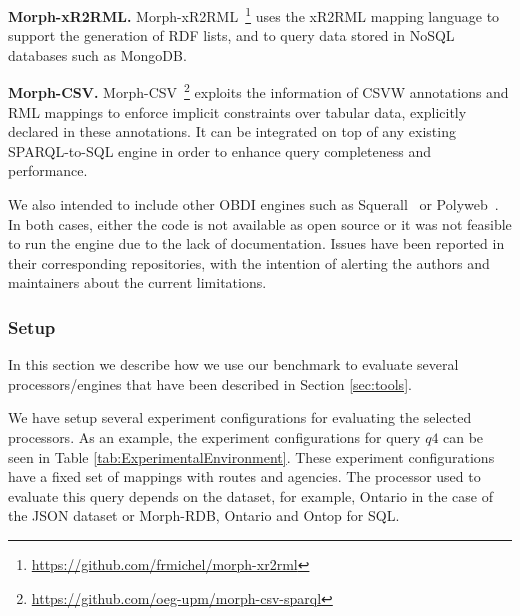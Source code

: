 \noindent\textbf{Morph-xR2RML.} Morph-xR2RML~\citep{michel2015translation}\footnote{\url{https://github.com/frmichel/morph-xr2rml}} uses the xR2RML mapping language to support the generation of RDF lists, and to query data stored in NoSQL databases such as MongoDB.

\noindent\textbf{Morph-CSV.} Morph-CSV~\citep{chaves2020enhancing}\footnote{\url{https://github.com/oeg-upm/morph-csv-sparql}} exploits the information of CSVW annotations and RML mappings to enforce implicit constraints over tabular data, explicitly declared in these annotations. It can be integrated on top of any existing SPARQL-to-SQL engine in order to enhance query completeness and performance.

We also intended to include other OBDI engines such as Squerall~\citep{mami2019querying} or Polyweb~\citep{khan2019one}. In both cases, either the code is not available as open source or it was not feasible to run the engine due to the lack of documentation. Issues have been reported in their corresponding repositories, with the intention of alerting the authors and maintainers about the current limitations.

\subsubsection{Setup}
In this section we describe how we use our benchmark to evaluate several processors/engines that have been described in Section \ref{sec:tools}. 

We have setup several experiment configurations for evaluating the selected processors. As an example, the experiment configurations for query $q4$ can be seen in Table \ref{tab:ExperimentalEnvironment}. These experiment configurations have a fixed set of mappings with routes and agencies. The processor used to evaluate this query depends on the dataset, for example, Ontario in the case of the JSON dataset or Morph-RDB, Ontario and Ontop for SQL.

